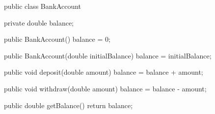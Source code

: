 \begin{unipdcode}[language=Java]
public class BankAccount {
    private double balance;

    public BankAccount() {
        balance = 0;
    }

    public BankAccount(double initialBalance) {
        balance = initialBalance;
    }

    public void deposit(double amount) {
        balance = balance + amount;
    }

    public void withdraw(double amount) {
        balance = balance - amount;
    }

    public double getBalance() {
        return balance;
    }
}
\end{unipdcode}
